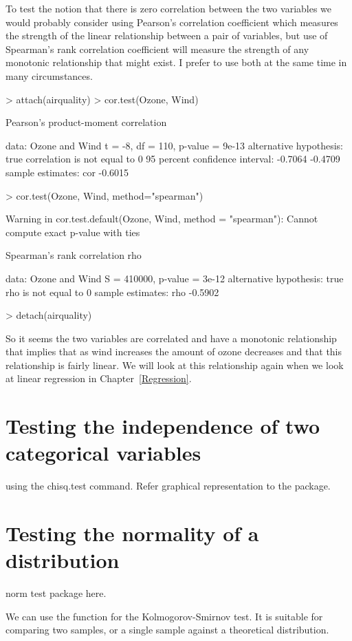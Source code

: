 To test the notion that there is zero correlation between the two variables we would probably consider using Pearson's correlation coefficient which measures the strength of the linear relationship between a pair of variables, but use of Spearman's rank correlation coefficient will measure the strength of any monotonic relationship that might exist. I prefer to use both at the same time in many circumstances. 
\begin{Schunk}
\begin{Sinput}
> attach(airquality) 
> cor.test(Ozone, Wind) 
\end{Sinput}
\begin{Soutput}

	Pearson's product-moment correlation

data:  Ozone and Wind
t = -8, df = 110, p-value = 9e-13
alternative hypothesis: true correlation is not equal to 0
95 percent confidence interval:
 -0.7064 -0.4709
sample estimates:
    cor 
-0.6015 
\end{Soutput}
\begin{Sinput}
> cor.test(Ozone, Wind, method="spearman") 
\end{Sinput}
\begin{Soutput}
Warning in cor.test.default(Ozone, Wind, method = "spearman"): Cannot compute exact p-value with ties
\end{Soutput}
\begin{Soutput}

	Spearman's rank correlation rho

data:  Ozone and Wind
S = 410000, p-value = 3e-12
alternative hypothesis: true rho is not equal to 0
sample estimates:
    rho 
-0.5902 
\end{Soutput}
\begin{Sinput}
> detach(airquality) 
\end{Sinput}
\end{Schunk}
So it seems the two variables are correlated and have a monotonic relationship that implies that as wind increases the amount of ozone decreases and that this relationship is fairly linear. We will look at this relationship again when we look at linear regression in Chapter~\ref{Regression}. 
 
 
 
 
 
\section{Testing the independence of two categorical variables} 
using the chisq.test command. 
Refer graphical representation to the  package. 
 
\section{Testing the normality of a distribution} 
 
norm test package here. 
 
We can use the  function for the Kolmogorov-Smirnov test. It is suitable for comparing two samples, or a single sample against a theoretical distribution. 
 

